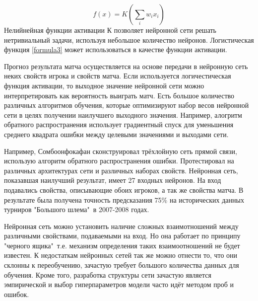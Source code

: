 \begin{equation}
f(x)=K(\sum_iw_ix_i)
\end{equation}
Нелийнейная функции активации К позволяет нейронной сети решать нетривиальный задачи, используя небольшое количество нейронов. Логистическая функция \ref{formula3} может использоваться в качестве функции активации.

Прогноз результата матча осуществляется на основе передачи в нейронную сеть неких свойств игрока и свойств матча. Если используется логичестическая функция активации, то выходное значение нейронной сети можно интерпретировать как вероятность выиграть матч. Есть большое количество различных алгоритмов обучения, которые оптимизируют набор весов нейронной сети в целях получении наилучшего выходного значения. Например, алогритм обратного распространения использует градиентный спуск для уменьшения среднего квадрата ошибки между целевыми значениями и выходами сети.

Например, Сомбоонфокафан\cite{Book12} сконструировал трёхлойную сеть прямой связи, использую алгоритм обратного распространения ошибки. Протестировал на различных архитектурах сети и различных наборах свойств. Нейронная сеть, показавшая наилучший результат, имеет 27 входных нейронов. На вход подавались свойства, описывающие обоих игроков, а так же свойства матча. В результате была получена точность предсказания 75\% на исторических данных турниров "Большого шлема"\ в 2007-2008 годах.

Нейронная сеть можно установить наличие сложных взаимотношений между различными свойствами, подаваемыми на вход. Но она работает по принципу "черного ящика"\, т.е. механизм определения таких взаимоотношений не будет известен. К недостаткам нейронных сетей так же можно отнести то, что они склонны к переобучению, зачастую требует большого количества данных для обучения. Кроме того, разработка структуры сети зачастую является эмпирической и выбор гиперпараметров модели часто идёт методом проб и ошибок.
